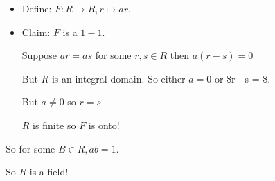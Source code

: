 \documentclass[11pt]{article}
\begin{document}
\begin{itemize}
\begin{itemize}
\begin{itemize}
\item Define: \(F : R \to R, r \mapsto ar\).
\item Claim: \(F\) is a \(1-1\).

Suppose \(ar = as\) for some \(r, s \in R\) then \(a(r - s) = 0\)

But \(R\) is an integral domain. So either \(a = 0\) or \$r - s = \$.

But \(a \neq 0\) so \(r = s\)

\(R\) is finite so \(F\) is onto!
\end{itemize}

So for some \(B \in R, ab = 1\).

So \(R\) is a field!
\end{itemize}
\end{itemize}
\end{document}
